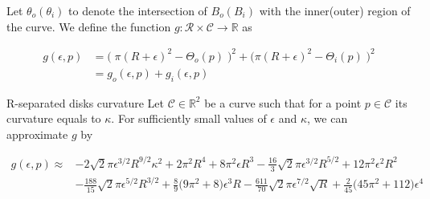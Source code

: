 Let $\theta_o (\theta_i)$ to denote the intersection of $B_o(B_i)$ with the inner(outer) region of the curve. We define the function $g:\mathcal{R} \times \mathcal{C}\rightarrow \mathbb{R}$ as

\begin{align*}
	g(\epsilon,p) &= \Big(\; \pi (R+\epsilon)^2 - \Theta_o(p) \; \Big)^2 + \Big(\pi (R+\epsilon)^2 - \Theta_i(p) \;\Big)^2\\
		 &= g_o(\epsilon,p) + g_i(\epsilon,p)
\end{align*}

\begin{claim}{R-separated disks curvature}\label{claim:r-separated-disks}
 Let $\mathcal{C} \in \mathbb{R}^2$ be a curve such that for a point $p \in \mathcal{C}$ its curvature equals to $\kappa$. For sufficiently small values of $\epsilon$ and $\kappa$, we can approximate $g$ by

\begin{align*}
g(\epsilon,p) \approx & -2\sqrt{2}\pi\epsilon^{3/2}R^{9/2}\kappa^{2} + 2\pi^2R^4 + 8\pi^2\epsilon R^3 - \frac{16}{3}\sqrt{2}\pi \epsilon^{3/2}R^{5/2} + 12\pi^2 \epsilon^2R^2 \\
& - \frac{188}{15}\sqrt{2}\pi \epsilon^{5/2}R^{3/2} + \frac{8}{9}\big(9\pi^2 + 8\big)\epsilon^3 R - \frac{611}{70}\sqrt{2}\pi \epsilon^{7/2}\sqrt{R} + \frac{2}{45}\big( 45\pi^2 + 112\big)\epsilon^4
\end{align*} 
\end{claim}


